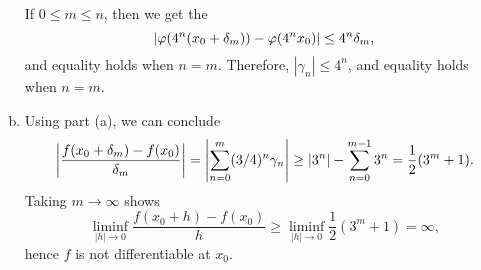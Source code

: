\begin{pb}[4]
\begin{soln}
\begin{enumerate}[(a)]
        If \(0 \leq m \leq n\), then we get the
        \begin{equation*}
            \abs{\varphi(4^n(x_0 + \delta_m)) - \varphi(4^n x_0)} \leq 4^n \delta_m,
        \end{equation*}
        and equality holds when \(n = m\).
        Therefore, \(|\gamma_n| \leq 4^n\), and equality holds when \(n = m\).

    \item
        Using part (a), we can conclude
        \begin{equation*}
            \abs{\frac{f(x_0 + \delta_m) - f(x_0)}{\delta_m}}
            = \abs{\sum_{n = 0}^{m} (3/4)^n \gamma_n}
            \geq |3^n| - \sum_{n = 0}^{m - 1} 3^n
            = \frac{1}{2}(3^m + 1).
        \end{equation*}
        Taking \(m \to \infty\) shows
        \begin{equation*}
            \liminf_{|h| \to 0} \frac{f(x_0 + h) - f(x_0)}{h}
            \geq \liminf_{|h| \to 0} \frac{1}{2} (3^m + 1)
            = \infty,
        \end{equation*}
        hence \(f\) is not differentiable at \(x_0\).


    \end{enumerate}

\end{soln}
\end{pb}
